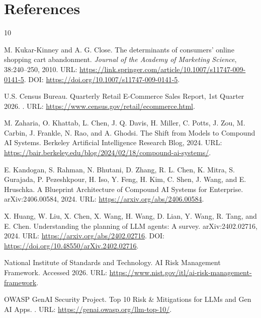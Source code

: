 \documentclass{article}
\begin{document}
\section*{References}
\begin{thebibliography}{10}

M. Kukar-Kinney and A. G. Close.
\newblock The determinants of consumers' online shopping cart abandonment.
\newblock \emph{Journal of the Academy of Marketing Science}, 38:240--250, 2010.
\newblock URL: \url{https://link.springer.com/article/10.1007/s11747-009-0141-5}. DOI: \url{https://doi.org/10.1007/s11747-009-0141-5}.

U.S. Census Bureau.
\newblock Quarterly Retail E-Commerce Sales Report, 1st Quarter 2026.
.
\newblock URL: \url{https://www.census.gov/retail/ecommerce.html}.

M. Zaharia, O. Khattab, L. Chen, J. Q. Davis, H. Miller, C. Potts, J. Zou, M. Carbin, J. Frankle, N. Rao, and A. Ghodsi.
\newblock The Shift from Models to Compound AI Systems.
\newblock Berkeley Artificial Intelligence Research Blog, 2024.
\newblock URL: \url{https://bair.berkeley.edu/blog/2024/02/18/compound-ai-systems/}.

E. Kandogan, S. Rahman, N. Bhutani, D. Zhang, R. L. Chen, K. Mitra, S. Gurajada, P. Pezeshkpour, H. Iso, Y. Feng, H. Kim, C. Shen, J. Wang, and E. Hruschka.
\newblock A Blueprint Architecture of Compound AI Systems for Enterprise.
\newblock arXiv:2406.00584, 2024.
\newblock URL: \url{https://arxiv.org/abs/2406.00584}.

X. Huang, W. Liu, X. Chen, X. Wang, H. Wang, D. Lian, Y. Wang, R. Tang, and E. Chen.
\newblock Understanding the planning of LLM agents: A survey.
\newblock arXiv:2402.02716, 2024.
\newblock URL: \url{https://arxiv.org/abs/2402.02716}. DOI: \url{https://doi.org/10.48550/arXiv.2402.02716}.

National Institute of Standards and Technology.
\newblock AI Risk Management Framework.
\newblock Accessed 2026.
\newblock URL: \url{https://www.nist.gov/itl/ai-risk-management-framework}.

OWASP GenAI Security Project.
 Top 10 Risk \& Mitigations for LLMs and Gen AI Apps.
.
\newblock URL: \url{https://genai.owasp.org/llm-top-10/}.


\end{thebibliography}
\end{document}
